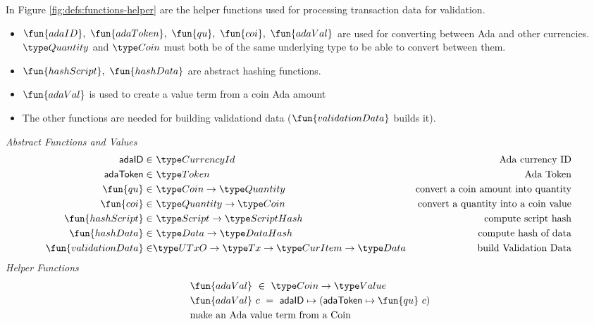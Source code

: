 In Figure \ref{fig:defs:functions-helper} are the helper functions used for
processing transaction data for validation.

\begin{itemize}
  \item $\fun{adaID},~\fun{adaToken},~\fun{qu},~\fun{coi},~\fun{adaVal}$ are used
  for converting between Ada and other currencies. $\Quantity$ and $\Coin$
  must both be of the same underlying type to be able to convert between them.
  \item $\fun{hashScript},~ \fun{hashData}$ are abstract hashing functions.
  \item $\fun{adaVal}$ is used to create a value term from a coin Ada amount
  \item The other functions are needed for building validationd data
  ($\fun{validationData}$ builds it).
\end{itemize}

\begin{figure*}[htb]
  \emph{Abstract Functions and Values}
  \begin{align*}
    \mathsf{adaID} \in& ~\CurrencyId
    & \text{Ada currency ID} \\
    \mathsf{adaToken} \in& ~\Token
    & \text{Ada Token} \\
    \fun{qu} \in& ~\Coin \to \Quantity
    & \text{convert a coin amount into quantity} \\
    \fun{coi} \in& ~\Quantity \to \Coin
    & \text{convert a quantity into a coin value} \\
    \fun{hashScript} \in & ~\Script\to \HashScr
    & \text{compute script hash} \\
    \fun{hashData} \in & ~\Data \to \HashDat
    & \text{compute hash of data} \\
    \fun{validationData} \in & \UTxO \to \Tx \to \CurItem \to \Data
    & \text{build Validation Data} \\
  \end{align*}
  \emph{Helper Functions}
  \begin{align*}
    &\fun{adaVal} ~\in~ \Coin \to \Value \\
    &\fun{adaVal}~{c} ~=~ \mathsf{adaID} \mapsto (\mathsf{adaToken} \mapsto  \fun{qu}~c) \\
    & \text{make an Ada value term from a Coin} \\~\\
  \end{align*}
  \caption{Script Validation}
  \label{fig:defs:functions-helper}
\end{figure*}


